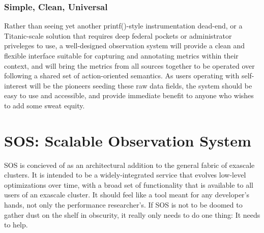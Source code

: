 \subsubsection{Simple, Clean, Universal}
Rather than seeing yet another printf()-style instrumentation
dead-end, or a Titanic-scale solution that requires deep federal
pockets or administrator priveleges to use, a well-designed
observation system will provide a clean and flexible interface
suitable for capturing and annotating metrics within their context,
and will bring the metrics from all sources together to be operated
over following a shared set of action-oriented semantics. As users
operating with self-interest will be the pioneers seeding these raw
data fields, the system should be easy to use and accessible, and
provide immediate benefit to anyone who wishes to add some sweat
equity.




\section{SOS: Scalable Observation System}

SOS is concieved of as an architectural addition to the general fabric
of exascale clusters. It is intended to be a widely-integrated service
that evolves low-level optimizations over time, with a broad set of
functionality that is available to all users of an exascale
cluster. It should feel like a tool meant for any developer's hands,
not only the performance researcher's. If SOS is not to be doomed to
gather dust on the shelf in obscurity, it really only needs to do one
thing: It needs to help.

